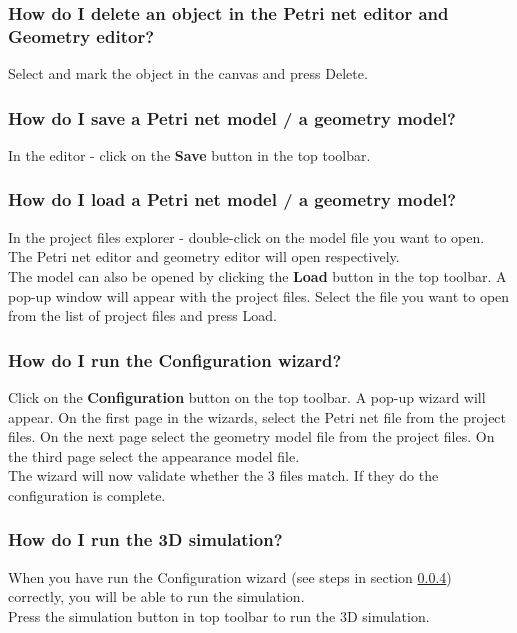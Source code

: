 \documentclass[fontsize=12pt, paper=a4]{article}
\begin{document}
\subsubsection{How do I delete an object in the Petri net editor and Geometry editor?}
Select and mark the object in the canvas and press Delete.

\subsubsection{How do I save a Petri net model / a geometry model?}
In the editor - click on the \textbf{Save} button in the top toolbar.

\subsubsection{How do I load a Petri net model / a geometry model?}
In the project files explorer - double-click on the model file you want to open. \\
The Petri net editor and geometry editor will open respectively. \\
\newline
The model can also be opened by clicking the \textbf{Load} button in the top toolbar.
A pop-up window will appear with the project files. Select the file you want to open from the list of project files and press Load. 

\subsubsection{How do I run the Configuration wizard?} \label{sec:conf_wizard}
Click on the \textbf{Configuration} button on the top toolbar. 
A pop-up wizard will appear. On the first page in the wizards, select the Petri net file from the project files. On the next page select the geometry model file from the project files. On the third page select the appearance model file. \\
The wizard will now validate whether the 3 files match. If they do the configuration is complete. 

\subsubsection{How do I run the 3D simulation?}
When you have run the Configuration wizard (see steps in section \ref{sec:conf_wizard}) correctly, you will be able to run the simulation. \\
Press the simulation button in top toolbar to run the 3D simulation. 
\end{document}
